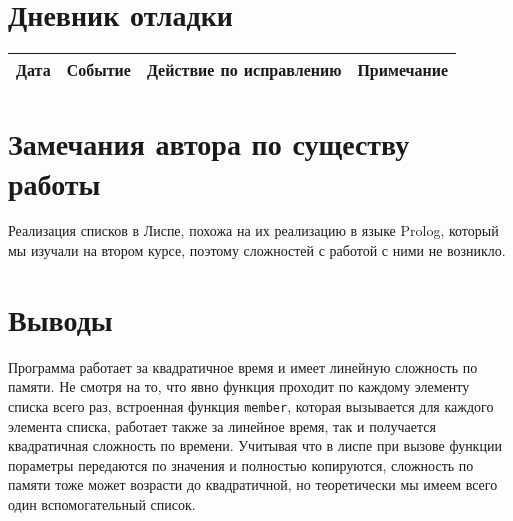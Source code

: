 \documentclass[12pt]{article}
\begin{document}
\section{Дневник отладки}
\begin{tabular}{|c|c|c|c|}
\hline
Дата & Событие & Действие по исправлению & Примечание \\
\hline
\end{tabular}

\section{Замечания автора по существу работы}
Реализация списков в Лиспе, похожа на их реализацию в языке Prolog, который мы изучали на втором курсе, поэтому сложностей с работой с ними не возникло.

\section{Выводы}
Программа работает за квадратичное время и имеет линейную сложность по памяти. Не смотря на то, что явно функция проходит по каждому элементу списка всего раз, встроенная функция {\tt member}, которая вызывается для каждого элемента списка, работает также за линейное время, так и получается квадратичная сложность по времени. Учитывая что в лиспе при вызове функции пораметры передаются по значения и полностью копируются, сложность по памяти тоже может возрасти до квадратичной, но теоретически мы имеем всего один вспомогательный список.
\end{document}
